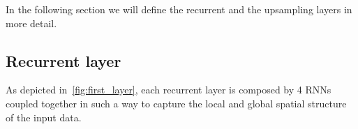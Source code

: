 In the following section we will define the recurrent and the upsampling layers
in more detail.

\subsection{Recurrent layer}
As depicted in~\autoref{fig:first_layer}, each recurrent layer is composed
by 4 RNNs coupled together in such a way to capture the local and global
spatial structure of the input data.

%

